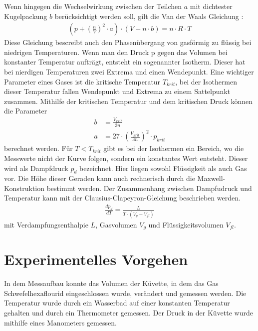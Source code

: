 \documentclass[11pt, a4paper]{article}
\begin{document}
    Wenn hingegen die Wechselwirkung zwischen der Teilchen $a$ mit dichtester Kugelpackung $b$
    berücksichtigt werden soll, gilt die Van der Waals Gleichung \cite[(4)]{ZUS}:
    \begin{align}
        \left(p+\left(\frac{n}{V}\right)^2 \cdot a\right) \cdot \left(V-n \cdot b \right) = n \cdot R \cdot T
    \end{align}
    Diese Gleichung bescreibt auch den Phasenübergang von gasförmig zu flüssig bei niedrigen Temperaturen.
    Wenn man den Druck p gegen das Volumen bei konstanter Temperatur aufträgt, entsteht ein sogenannter Isotherm.
    Dieser hat bei nierdigen Temperaturen zwei Extrema und einen Wendepunkt. 
    Eine wichtiger Parameter eines Gases ist die kritische Temperatur $T_{krit}$, bei der Isothermen dieser Temperatur
    fallen Wendepunkt und Extrema zu einem Sattelpunkt zusammen.
    Mithilfe der kritischen Temperatur und dem kritischen Druck können die Parameter
    \begin{align}
        b &= \frac{V_{krit}}{3n} \label{eq:b}\\
        a &= 27 \cdot \left(\frac{V_{krit}}{3n}\right)^2 \cdot p_{krit} \label{eq:a}
    \end{align} 
    berechnet werden.
    Für $T < T_{krit}$ gibt es bei der Isothermen ein Bereich,
    wo die Messwerte nicht der Kurve folgen, sondern ein konstantes Wert entsteht. Dieser wird als Dampfdruck $p_{d}$
    bezeichnet. Hier liegen sowohl Flüssigkeit als auch Gas vor. Die Höhe dieser Geraden kann auch rechnerisch durch die Maxwell-Konstruktion bestimmt werden.
    Der Zusammenhang zwischen Dampfudruck und Temperatur kann mit der Clausius-Clapeyron-Gleichung \cite[(9)]{ZUS} beschrieben werden.
    \begin{align}
        \frac{d p_d}{d T} = \frac{L}{T \cdot\left(V_g - V_{fl}\right)} \label{eq:delta}
    \end{align}
    mit Verdampfungsenthalpie $L$, Gasvolumen $V_g$ und Flüssigkeitsvolumen $V_{fl}$.

    \section{Experimentelles Vorgehen}
    In dem Messaufbau konnte das Volumen der Küvette, in dem das Gas Schwefelhexaflourid eingeschlossen wurde, verändert und gemessen werden.
    Die Temperatur wurde durch ein Wasserbad auf einer konstanten Temperatur gehalten und durch ein Thermometer gemessen. 
    Der Druck in der Küvette wurde mithilfe eines Manometers gemessen.
\end{document}

